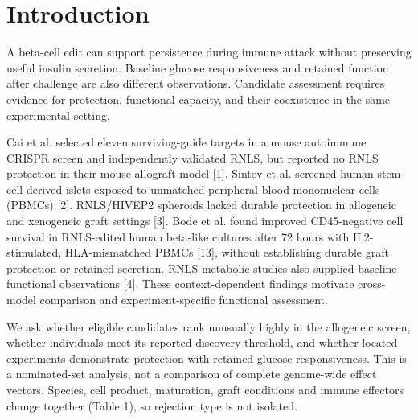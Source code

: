 \documentclass[11pt,letterpaper]{article}
\begin{document}
\section*{Introduction}
A beta-cell edit can support persistence during immune attack without preserving useful insulin secretion. Baseline glucose responsiveness and retained function after challenge are also different observations. Candidate assessment requires evidence for protection, functional capacity, and their coexistence in the same experimental setting.\par
Cai et al. selected eleven surviving-guide targets in a mouse autoimmune CRISPR screen and independently validated RNLS, but reported no RNLS protection in their mouse allograft model [1]. Sintov et al. screened human stem-cell-derived islets exposed to unmatched peripheral blood mononuclear cells (PBMCs) [2]. RNLS/HIVEP2 spheroids lacked durable protection in allogeneic and xenogeneic graft settings [3]. Bode et al. found improved CD45-negative cell survival in RNLS-edited human beta-like cultures after 72 hours with IL2-stimulated, HLA-mismatched PBMCs [13], without establishing durable graft protection or retained secretion. RNLS metabolic studies also supplied baseline functional observations [4]. These context-dependent findings motivate cross-model comparison and experiment-specific functional assessment.\par
We ask whether eligible candidates rank unusually highly in the allogeneic screen, whether individuals meet its reported discovery threshold, and whether located experiments demonstrate protection with retained glucose responsiveness. This is a nominated-set analysis, not a comparison of complete genome-wide effect vectors. Species, cell product, maturation, graft conditions and immune effectors change together (Table 1), so rejection type is not isolated.\par
\end{document}
